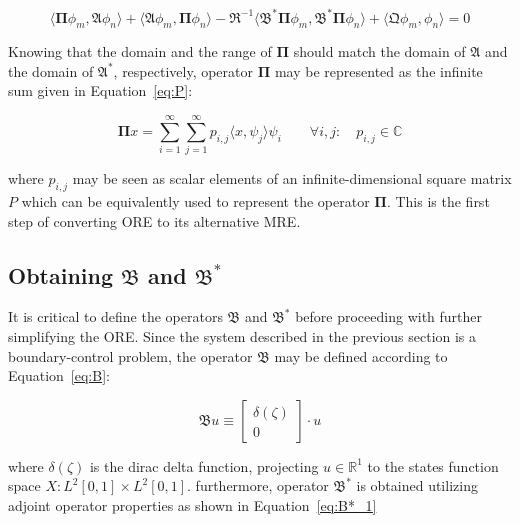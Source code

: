 \begin{equation} \label{eq:ORE_2}
    \langle \mathbf{\Pi} \phi_m, \mathfrak{A} \phi_n \rangle
    + \langle \mathfrak{A} \phi_m, \mathbf{\Pi} \phi_n \rangle
    - \mathfrak{R}^{-1} \langle \mathfrak{B}^* \mathbf{\Pi} \phi_m, \mathfrak{B}^* \mathbf{\Pi} \phi_n\rangle 
    + \langle \mathfrak{Q} \phi_m, \phi_n\rangle = 0
\end{equation}

Knowing that the domain and the range of $\mathbf{\Pi}$ should match the domain of $\mathfrak{A}$ and the domain of $\mathfrak{A}^*$, respectively, operator $\mathbf{\Pi}$ may be represented as the infinite sum given in Equation~\ref{eq:P}:

\begin{equation} \label{eq:P}
    \mathbf{\Pi} x = \sum_{i=1}^{\infty}\sum_{j=1}^{\infty} p_{i,j} \langle x, \psi_j \rangle \psi_i \qquad
    \forall {i,j}: \quad p_{i,j} \in \mathbb{C}
\end{equation}

where $p_{i,j}$ may be seen as scalar elements of an infinite-dimensional square matrix $P$ which can be equivalently used to represent the operator $\mathbf{\Pi}$. This is the first step of converting ORE to its alternative MRE.

\subsection{Obtaining $\mathfrak{B}$ and $\mathfrak{B}^*$}

It is critical to define the operators $\mathfrak{B}$ and $\mathfrak{B}^*$ before proceeding with further simplifying the ORE. Since the system described in the previous section is a boundary-control problem, the operator $\mathfrak{B}$ may be defined according to Equation~\ref{eq:B}:

\begin{equation} \label{eq:B}
    \mathfrak{B} u \equiv
    \begin{bmatrix}
       \delta(\zeta) \\ 0
    \end{bmatrix} \cdot u
\end{equation}

where $\delta(\zeta)$ is the dirac delta function, projecting $u \in \mathbb{R}^1$ to the states function space $X: L^2[0,1] \times L^2[0,1]$. furthermore, operator $\mathfrak{B}^*$ is obtained utilizing adjoint operator properties as shown in Equation~\ref{eq:B*_1}

